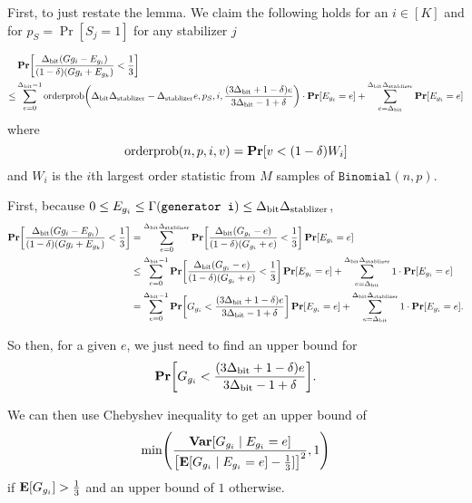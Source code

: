 \newcommand{\orderpinner}{\DegBit\DegStable - \DegStable e, p_S, i, \frac{(3\DegBit + 1 - \delta) e}{3\DegBit -1 + \delta}}
\newcommand{\desiredGPrimeUpperBound}{\frac{(3 \DegBit + 1 - \delta) e}{3 \DegBit - 1 + \delta}}
\newcommand{\generatorscoreRVGivenE}{G''}

First, to just restate the lemma.
We claim the following holds for an $i \in [K]$ and for $p_S = \Pr[S_j = 1]$ for any stabilizer $j$
	
\begin{align*}
	&\Pr\mleft[\OptVarEq < \frac{1}{3}\mright] \\
	\leq &\sum_{e = 0}^{\DegBit - 1} 
			\OrderP\mleft(\orderpinner\mright) \cdot \Pr[\lyingGenerator_{g_i} = e] 
			+ \sum_{e = \DegBit}^{\DegBit\DegStable}\Pr[\lyingGenerator_{g_i} = e]
\end{align*}
where
$$
	\OrderP(n, p, i, v) = \Pr\mleft[v < (1 - \delta) W_i \mright]
$$
and $W_i$ is the $i$th largest order statistic from $M$ samples of $\texttt{Binomial}(n, p)$.


First, because $0 \leq E_{g_i} \leq \Gamma(\texttt{generator i}) \leq {\Delta_{\text{bit}}} {\Delta_{\text{stablizer}}}$, 
\begin{align*}
\Pr\mleft[\OptVarEq < \frac{1}{3}\mright] &= 
	\sum_{e = 0}^{\DegBit \DegStable} 
		\Pr\mleft[\frac{\DegBit(\genscoreRVCorrected_{g_i} - e)}{(1 - \delta)(\genscoreRVCorrected_{g_i} + e)} < \frac{1}{3} \mright] \Pr\mleft[\lyingGenerator_{g_i} = e\mright]\\
&\leq
	\sum_{e = 0}^{\DegBit - 1} 
		\Pr\mleft[\frac{\DegBit(\genscoreRVCorrected_{g_i} - e)}{(1 - \delta)(\genscoreRVCorrected_{g_i} + e)} < \frac{1}{3} \mright] \Pr\mleft[\lyingGenerator_{g_i} = e\mright]
	+ \sum_{e = \DegBit}^{\DegBit \DegStable} 1 \cdot \Pr\mleft[E_{g_i} = e\mright]\\
&=
	\sum_{e = 0}^{\DegBit - 1} 
		\Pr\mleft[\genscoreRVCorrected_{g_i} < \frac{(3 \DegBit + 1 - \delta) e}{3 \DegBit - 1 + \delta} \mright] \Pr\mleft[E_{g_i} = e\mright]
	+ \sum_{e = \DegBit}^{\DegBit \DegStable} 1 \cdot \Pr\mleft[\lyingGenerator_{g_i} = e\mright].\\
\end{align*}

So then, for a given $e$,
we just need to find an upper bound for
\begin{align*}
	\Pr\mleft[\genscoreRVCorrected_{g_i} < \desiredGPrimeUpperBound \mright].
\end{align*}

We can then use Chebyshev inequality to get an upper bound of
$$
	\min\mleft(\frac{\Var[\genscoreRVCorrected_{g_i} \mid \lyingGenerator_{g_i} = e]}
		{\mleft[\E[\genscoreRVCorrected_{g_i} \mid \lyingGenerator_{g_i} = e] - \frac{1}{3}]\mright]^2}, 1\mright)
$$
if $\operatorname*{\mathbf{E}}[G_{g_i}] > \frac{1}{3}$ and an upper bound of $1$ otherwise.

